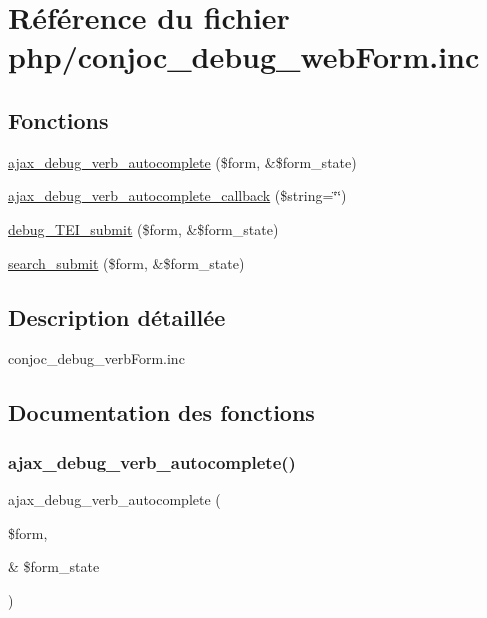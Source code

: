 \hypertarget{php_2conjoc__debug__web_form_8inc}{}\section{Référence du fichier php/conjoc\+\_\+debug\+\_\+web\+Form.inc}
\label{php_2conjoc__debug__web_form_8inc}
\subsection*{Fonctions}
\begin{DoxyCompactItemize}
\item 
\hyperlink{php_2conjoc__debug__web_form_8inc_aafe244ee66a2c6e333d48efccec9164f}{ajax\+\_\+debug\+\_\+verb\+\_\+autocomplete} (\$form, \&\$form\+\_\+state)
\item 
\hyperlink{php_2conjoc__debug__web_form_8inc_aedd67c4b770b58826708010ce4ef7ac7}{ajax\+\_\+debug\+\_\+verb\+\_\+autocomplete\+\_\+callback} (\$string=\char`\"{}\char`\"{})
\item 
\hyperlink{php_2conjoc__debug__web_form_8inc_af6a94ce95f29fca17e5a3fb82855e835}{debug\+\_\+\+T\+E\+I\+\_\+submit} (\$form, \&\$form\+\_\+state)
\item 
\hyperlink{php_2conjoc__debug__web_form_8inc_a11d1063e5c7b2bf2e290639c78266d71}{search\+\_\+submit} (\$form, \&\$form\+\_\+state)
\end{DoxyCompactItemize}


\subsection{Description détaillée}
conjoc\+\_\+debug\+\_\+verb\+Form.\+inc 

\subsection{Documentation des fonctions}
\hypertarget{php_2conjoc__debug__web_form_8inc_aafe244ee66a2c6e333d48efccec9164f}{}\label{php_2conjoc__debug__web_form_8inc_aafe244ee66a2c6e333d48efccec9164f} 
\subsubsection{\texorpdfstring{ajax\+\_\+debug\+\_\+verb\+\_\+autocomplete()}{ajax\_debug\_verb\_autocomplete()}}
{\footnotesize\ttfamily ajax\+\_\+debug\+\_\+verb\+\_\+autocomplete (\begin{DoxyParamCaption}\item[{}]{\$form,  }\item[{\&}]{\$form\+\_\+state }\end{DoxyParamCaption})}


